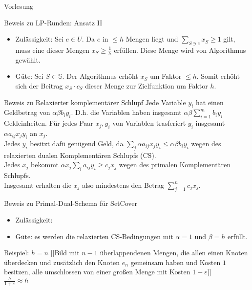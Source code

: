 \begin{section}{Vorlesung}
  \begin{subsection}{Beweis zu LP-Runden: Ansatz II}
    \begin{itemize}
    \item Zulässigkeit: Sei $e \in U$. Da $e$ in $\leq h$ Mengen liegt und $\sum_{S\ni e} x_S \geq 1$ gilt, muss eine dieser Mengen $x_S \geq \frac{1}{h}$ erfüllen. Diese Menge wird von Algorithmus gewählt.
    \item Güte: Sei $S \in \mathbb{S}$. Der Algorithmus erhöht $x_S$ um Faktor $\leq h$. Somit erhöht sich der Beitrag $x_S \cdot c_S$ dieser Menge zur Zielfunktion um Faktor $h$.
    \end{itemize}
  \end{subsection}
  \begin{subsection}{Beweis zu Relaxierter komplementärer Schlupf}
  Jede Variable $y_i$ hat einen Geldbetrag von $\alpha\beta b_i y_i$. D.h. die Variablen haben insgesamt $\alpha \beta \sum_{i=1}^m b_i y_i$ Geldeinheiten. Für jedes Paar $x_j,y_i$ von Variablen trasferiert $y_i$ insgesamt $\alpha a_{ij} x_j y_i$ an $x_j$. \\
  Jedes $y_i$ besitzt dafü genügend Geld, da $\sum_j \alpha a_{ij} x_j y_i \leq \alpha \beta b_i y_i$ wegen des relaxierten dualen Komplementären Schlupfs (CS). \\
  Jedes $x_j$ bekommt $\alpha x_j \sum_i a_{ij} y_i \geq c_j x_j$ wegen des primalen Komplementären Schlupfs.\\
  Insgesamt erhalten die $x_j$ also mindestens den Betrag $\sum_{j=1}^n c_j x_j$. 
  \end{subsection}
  \begin{subsection}{Beweis zu Primal-Dual-Schema für SetCover}
  \begin{itemize}
    \item Zulässigkeit: \checkmark
    \item Güte: es werden die relaxierten CS-Bedingungen mit $\alpha = 1$ und $\beta = h$ erfüllt.
  \end{itemize}
  Beispiel: $h=n$ [[Bild mit $n-1$ überlappendenen Mengen, die allen einen Knoten überdecken und zusätzlich den Knoten $e_n$ gemeinsam haben und Kosten $1$ besitzen, alle umschlossen von einer großen Menge mit Kosten $1+\varepsilon$]] \\
  $\frac{h}{1+\varepsilon} \approx h$
  \end{subsection}
\end{section}
